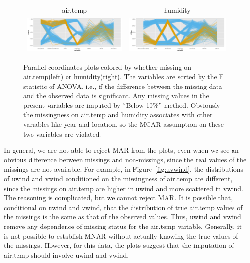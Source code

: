 \documentclass[article]{jss}
\begin{document}
\begin{center}
\begin{figure}[h]
\begin{centering}
\begin{tabular}{cc}
{\tiny{air.temp}} & {\tiny{humidity}}\tabularnewline
\includegraphics[width=.48\textwidth]{graph/fig12-2-air-temp-2} & 
\includegraphics[width=.48\textwidth]{graph/fig12-3-humidity-2} \tabularnewline
\end{tabular}
\par\end{centering}
\caption{Parallel coordinates plots colored by whether missing on air.temp(left) or humidity(right). The variables are sorted by the F statistic of ANOVA, i.e., if the difference between the missing data and the observed data is significant. Any missing values in the present variables are imputed by ``Below 10\%'' method. Obviously the missingness on air.temp and humidity associates with other variables like year and location, so the MCAR assumption on these two variables are violated.}
\label{fig:pcpCheck}
\end{figure}
\par\end{center}


In general, we are not able to reject MAR from the plots, even when we see an obvious difference between missings and non-missings, since the real values of the missings are not available. For example, in Figure~\ref{fig:uvwind}, the distributions of uwind and vwind conditioned on the missingness of air.temp are different, since the missings on air.temp are higher in uwind and more scattered in vwind. The reasoning is complicated, but we cannot reject MAR. It is possible that, conditional on uwind and vwind, that the distribution of true air.temp values of the missings is the same as that of the observed values. Thus, uwind and vwind remove any dependence of missing status for the air.temp variable. Generally, it is not possible to establish MNAR without actually knowing the true values of the missings. However, for this data, the plots suggest that the imputation of air.temp should involve uwind and vwind.
\end{document}
